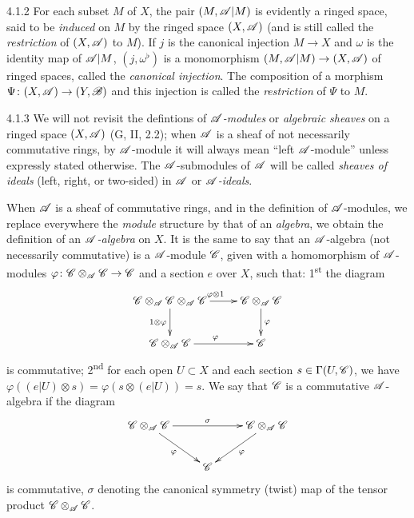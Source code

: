 \documentclass{book}
\begin{document}
\begin{env}{4.1.2}
\label{env-0.4.1.2}
For each subset $M$ of $X$, the pair $(M,\mathscr{A}|M)$ is evidently a ringed space, said
to be \emph{induced} on $M$ by the ringed space $(X,\mathscr{A})$ (and is still called
the \emph{restriction} of $(X,\mathscr{A})$ to $M$). If $j$ is the canonical injection
$M\to X$ and $\omega$ is the identity map of $\mathscr{A}|M$, $(j,\omega^\flat)$ is a
monomorphism $(M,\mathscr{A}|M)\to(X,\mathscr{A})$ of ringed spaces, called the
\emph{canonical injection}. The composition of a morphism
$\Psi\colon(X,\mathscr{A})\to(Y,\mathscr{B})$ and this injection is called the \emph{restriction}
of $\Psi$ to $M$.
\end{env}

\begin{env}{4.1.3}
\label{env-0.4.1.3}
We will not revisit the defintions of \emph{$\mathscr{A}$-modules} or
\emph{algebraic sheaves} on a ringed space $(X,\mathscr{A})$ (G, II, 2.2);
when $\mathscr{A}$ is a sheaf of not necessarily commutative rings, by $\mathscr{A}$-module
it will always mean ``left $\mathscr{A}$-module'' unless expressly stated otherwise. The
$\mathscr{A}$-submodules of $\mathscr{A}$ will be called \emph{sheaves of ideals} (left,
right, or two-sided) in $\mathscr{A}$ or \emph{$\mathscr{A}$-ideals}.

When $\mathscr{A}$ is a sheaf of commutative rings, and in the definition of
$\mathscr{A}$-modules, we replace everywhere the \emph{module} structure by that of
an \emph{algebra}, we obtain the definition of an \emph{$\mathscr{A}$-algebra} on $X$.
It is the same to say that an $\mathscr{A}$-algebra (not necessarily commutative) is
a $\mathscr{A}$-module $\mathscr{C}$, given with a homomorphism of $\mathscr{A}$-modules
$\varphi\colon\mathscr{C}\otimes_{\mathscr{A}}\mathscr{C}\to\mathscr{C}$ and a section $e$ over $X$,
such that: 1\textsuperscript{st} the diagram
\[
  \xymatrix{
    \sheaf{C}\otimes_{\sheaf{A}}\sheaf{C}\otimes_{\sheaf{A}}\sheaf{C}
    \ar[r]^{\varphi\otimes 1}\ar[d]_{1\otimes\varphi} &
    \sheaf{C}\otimes_{\sheaf{A}}\sheaf{C}\ar[d]^\varphi\\
    \sheaf{C}\otimes_{\sheaf{A}}\sheaf{C}\ar[r]^\varphi & \sheaf{C}
  }
\]
is commutative; 2\textsuperscript{nd} for each open $U\subset X$ and each section
$s\in\Gamma(U,\mathscr{C})$, we have $\varphi((e|U)\otimes s)=\varphi(s\otimes(e|U))=s$.
We say that $\mathscr{C}$ is a commutative $\mathscr{A}$-algebra if the diagram
\[
  \xymatrix{
    \sheaf{C}\otimes_{\sheaf{A}}\sheaf{C}\ar[rr]^\sigma\ar[rd]_\varphi
    & & \sheaf{C}\otimes_{\sheaf{A}}\sheaf{C}\ar[ld]^\varphi\\
    & \sheaf{C}
  }
\]
is commutative, $\sigma$ denoting the canonical symmetry (twist) map of the tensor product
$\mathscr{C}\otimes_{\mathscr{A}}\mathscr{C}$.


\end{env}
\end{document}
